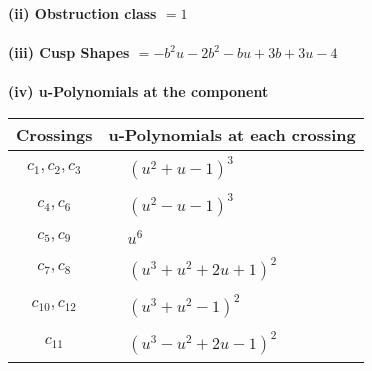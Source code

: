 \documentclass[1p]{elsarticle_modified}
\theoremstyle{definition}
\begin{document}
\flushleft \textbf{(ii) Obstruction class $= 1$}\\~\\
\flushleft \textbf{(iii) Cusp Shapes $= - b^2 u-2 b^2- b u+3 b+3 u-4$}\\~\\
\newpage\renewcommand{\arraystretch}{1}
\flushleft \textbf{(iv) u-Polynomials at the component}\newline \\
\begin{tabular}{m{50pt}|m{274pt}}
Crossings & \hspace{64pt}u-Polynomials at each crossing \\
\hline $$\begin{aligned}c_{1},c_{2},c_{3}\end{aligned}$$&$\begin{aligned}
&(u^2+u-1)^3
\end{aligned}$\\
\hline $$\begin{aligned}c_{4},c_{6}\end{aligned}$$&$\begin{aligned}
&(u^2- u-1)^3
\end{aligned}$\\
\hline $$\begin{aligned}c_{5},c_{9}\end{aligned}$$&$\begin{aligned}
&u^6
\end{aligned}$\\
\hline $$\begin{aligned}c_{7},c_{8}\end{aligned}$$&$\begin{aligned}
&(u^3+u^2+2 u+1)^2
\end{aligned}$\\
\hline $$\begin{aligned}c_{10},c_{12}\end{aligned}$$&$\begin{aligned}
&(u^3+u^2-1)^2
\end{aligned}$\\
\hline $$\begin{aligned}c_{11}\end{aligned}$$&$\begin{aligned}
&(u^3- u^2+2 u-1)^2
\end{aligned}$\\
\hline
\end{tabular}\\~\\
\end{document}
